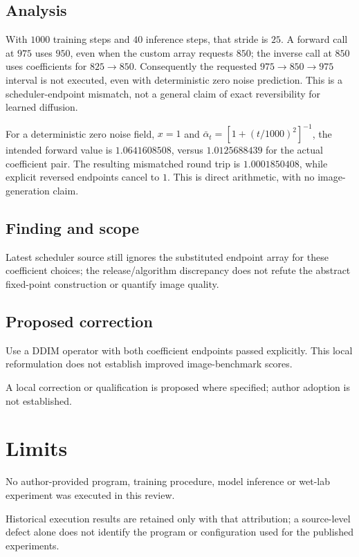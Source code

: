 \documentclass[11pt]{article}
\begin{document}
\subsection*{Analysis}

With \(1000\) training steps and \(40\) inference steps, that stride is \(25\). A forward call at \(975\) uses \(950\), even when the custom array requests \(850\); the inverse call at \(850\) uses coefficients for \(825\to850\). Consequently the requested \(975\to850\to975\) interval is not executed, even with deterministic zero noise prediction. This is a scheduler-endpoint mismatch, not a general claim of exact reversibility for learned diffusion.

For a deterministic zero noise field, \(x=1\) and \(\bar\alpha_t=[1+(t/1000)^2]^{-1}\), the intended forward value is \(1.0641608508\), versus \(1.0125688439\) for the actual coefficient pair. The resulting mismatched round trip is \(1.0001850408\), while explicit reversed endpoints cancel to \(1\). This is direct arithmetic, with no image-generation claim.

\subsection*{Finding and scope}

Latest scheduler source still ignores the substituted endpoint array for these coefficient choices; the release/algorithm discrepancy does not refute the abstract fixed-point construction or quantify image quality.

\subsection*{Proposed correction}

Use a DDIM operator with both coefficient endpoints passed explicitly. This local reformulation does not establish improved image-benchmark scores.

A local correction or qualification is proposed where specified; author adoption is not established.

\section*{Limits}

No author-provided program, training procedure, model inference or wet-lab experiment was executed in this review.\par

Historical execution results are retained only with that attribution; a source-level defect alone does not identify the program or configuration used for the published experiments.\par
\end{document}
